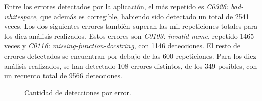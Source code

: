 \documentclass[a4paper, 12pt]{book}
\begin{document}
Entre los errores detectados por la aplicación, el más repetido es \textit{C0326: bad-whitespace}, que además es corregible, habiendo sido detectado un total de 2541 veces.
Los dos siguientes errores también superan las mil repeticiones totales para los diez análisis realizados. Estos errores son \textit{C0103: invalid-name}, repetido 1465 veces y \textit{C0116: missing-function-docstring}, con 1146 detecciones.
El resto de errores detectados se encuentran por debajo de las 600 repeticiones.
Para los diez análisis realizados, se han detectado 108 errores distintos, de los 349 posibles, con un recuento total de 9566 detecciones.
\newline
\begin{figure}[h]
  \centering
  \caption{Cantidad de detecciones por error.}\label{fig:errores_detectados}
\end{figure}
\newpage
\end{document}
